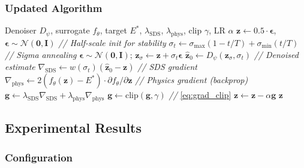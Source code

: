 \documentclass[12pt,a4paper]{article}
\newcommand{\N}{\mathcal{N}}
\newcommand{\Etar}{E^{*}}
\newcommand{\zvec}{\bm{z}}
\theoremstyle{definition}
\begin{document}
\subsubsection{Updated Algorithm}

\begin{algorithm}[H]
\caption{Gradient-Clipped SDS Inverse Design (Implemented)}
\label{alg:sds_impl}
\begin{algorithmic}[1]
\REQUIRE Denoiser $D_\psi$, surrogate $f_\theta$, target $\Etar$,
  $\lambda_{\mathrm{SDS}}$, $\lambda_{\mathrm{phys}}$, clip $\gamma$, LR $\alpha$
\STATE $\zvec \gets 0.5 \cdot \bm{\epsilon}$, \quad $\bm{\epsilon} \sim \N(\bm{0}, \bm{I})$
  \hfill \textit{// Half-scale init for stability}
  \STATE $\sigma_t \gets \sigma_{\max}(1 - t/T) + \sigma_{\min}(t/T)$
    \hfill \textit{// Sigma annealing}
  \STATE $\bm{\epsilon} \sim \N(\bm{0}, \bm{I})$; \quad
    $\zvec_\sigma \gets \zvec + \sigma_t \bm{\epsilon}$
  \STATE $\hat{\zvec}_0 \gets D_\psi(\zvec_\sigma, \sigma_t)$
    \hfill \textit{// Denoised estimate}
  \STATE $\nabla_{\mathrm{SDS}} \gets w(\sigma_t)(\hat{\zvec}_0 - \zvec)$
    \hfill \textit{// SDS gradient}
  \STATE $\nabla_{\mathrm{phys}} \gets 2(f_\theta(\zvec) - \Etar) \cdot \partial f_\theta / \partial \zvec$
    \hfill \textit{// Physics gradient (backprop)}
  \STATE $\bm{g} \gets \lambda_{\mathrm{SDS}} \nabla_{\mathrm{SDS}} + \lambda_{\mathrm{phys}} \nabla_{\mathrm{phys}}$
  \STATE $\bm{g} \gets \mathrm{clip}(\bm{g}, \gamma)$
    \hfill \textit{// } \eqref{eq:grad_clip}
  \STATE $\zvec \gets \zvec - \alpha \bm{g}$
\ENDFOR
\RETURN $\zvec$
\end{algorithmic}
\end{algorithm}

\subsection{Experimental Results}

\subsubsection{Configuration}
\end{document}
